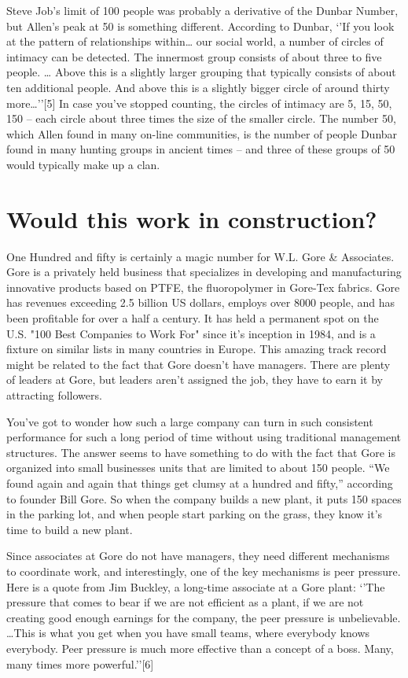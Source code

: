 Steve Job’s limit of 100 people was probably a derivative of the Dunbar Number, but Allen’s peak at 50 is something different. According to Dunbar, `'If you look at the pattern of relationships within… our social world, a number of circles of intimacy can be detected. The innermost group consists of about three to five people. … Above this is a slightly larger grouping that typically consists of about ten additional people. And above this is a slightly bigger circle of around thirty more…''[5] In case you’ve stopped counting, the circles of intimacy are 5, 15, 50, 150 – each circle about three times the size of the smaller circle. The number 50, which Allen found in many on-line communities, is the number of people Dunbar found in many hunting groups in ancient times – and three of these groups of 50 would typically make up a clan.

\section*{Would this work in construction?}

One Hundred and fifty is certainly a magic number for W.L. Gore \& Associates. Gore is a privately held business that specializes in developing and manufacturing innovative products based on PTFE, the fluoropolymer in Gore-Tex fabrics. Gore has revenues exceeding 2.5 billion US dollars, employs over 8000 people, and has been profitable for over a half a century. It has held a permanent spot on the U.S. "100 Best Companies to Work For" since it’s inception in 1984, and is a fixture on similar lists in many countries in Europe. This amazing track record might be related to the fact that Gore doesn’t have managers. There are plenty of leaders at Gore, but leaders aren’t assigned the job, they have to earn it by attracting followers.

You’ve got to wonder how such a large company can turn in such consistent performance for such a long period of time without using traditional management structures. The answer seems to have something to do with the fact that Gore is organized into small businesses units that are limited to about 150 people. “We found again and again that things get clumsy at a hundred and fifty,” according to founder Bill Gore. So when the company builds a new plant, it puts 150 spaces in the parking lot, and when people start parking on the grass, they know it’s time to build a new plant.

Since associates at Gore do not have managers, they need different mechanisms to coordinate work, and interestingly, one of the key mechanisms is peer pressure. Here is a quote from Jim Buckley, a long-time associate at a Gore plant: `'The pressure that comes to bear if we are not efficient as a plant, if we are not creating good enough earnings for the company, the peer pressure is unbelievable. …This is what you get when you have small teams, where everybody knows everybody. Peer pressure is much more effective than a concept of a boss. Many, many times more powerful.''[6]

